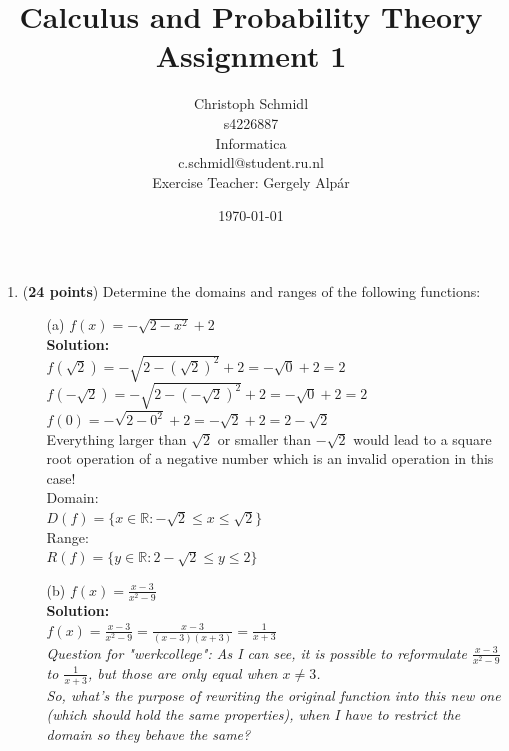 \documentclass[a4paper]{article}
\title{Calculus and Probability Theory\\ Assignment 1}
\author{Christoph Schmidl\\
s4226887\\
Informatica\\
c.schmidl@student.ru.nl\\
Exercise Teacher: Gergely Alp\'{a}r}
\date{\today}
\begin{document}
\maketitle

\begin{enumerate}

\item (\textbf{24 points}) Determine the domains and ranges of the following functions:


\begin{itemize}

\item[(a)] $f(x) = - \sqrt{2 - x^2} + 2$\\

\textbf{Solution:}\\

$f(\sqrt{2}) = - \sqrt{2 - (\sqrt{2})^2} + 2 = - \sqrt{0} + 2 = 2$\\

$f(- \sqrt{2}) = - \sqrt{2 - (-\sqrt{2})^2} + 2 = - \sqrt{0} + 2 = 2$\\

$f(0) = - \sqrt{2 - 0^2} + 2 = - \sqrt{2} + 2 = 2 - \sqrt{2}$\\

Everything larger than $\sqrt{2}$ or smaller than $-\sqrt{2}$ would lead to a square root operation of a negative number which is an invalid operation in this case!\\


Domain:\\

$D(f) = \{ x \in \mathbb{R}: - \sqrt{2} \leq x \leq \sqrt{2} \}$\\

Range:\\

$R(f) = \{ y \in \mathbb{R}: 2 - \sqrt{2} \leq y \leq 2 \}$\\




\item[(b)] $f(x) = \frac{x - 3}{x^2 - 9}$\\

\textbf{Solution:}\\

$f(x) = \frac{x - 3}{x^2 - 9} = \frac{x - 3}{(x - 3)(x + 3)} = \frac{1}{x + 3}$\\

\textit{Question for "werkcollege": As I can see, it is possible to reformulate $\frac{x - 3}{x^2 - 9}$ to $\frac{1}{x+3}$, but those are only equal when $x \neq 3$.\\ So, what's the purpose of rewriting the original function into this new one (which should hold the same properties), when I have to restrict the domain so they behave the same?}\\


\end{itemize}
\end{enumerate}
\end{document}
